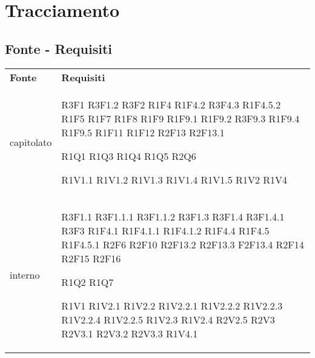 \section{Tracciamento}
	\subsection{Fonte - Requisiti}
	\begin{longtable} {
		>{\centering}p{28mm}  
		>{}p{20mm}
		}
	\rowcolor{gray!50}
		\textbf{Fonte} & \textbf{Requisiti}	\TBstrut \\
				
		capitolato & 
		R3F1
		R3F1.2
		R3F2
		R1F4
		R1F4.2
		R3F4.3
		R1F4.5.2
		R1F5
		R1F7
		R1F8
		R1F9
		R1F9.1
		R1F9.2
		R3F9.3
		R1F9.4
		R1F9.5
		R1F11
		R1F12
		R2F13
		R2F13.1
				
		R1Q1 
		R1Q3 
		R1Q4 
		R1Q5 
		R2Q6
		 
		R1V1.1 
		R1V1.2 
		R1V1.3 
		R1V1.4 
		R1V1.5 
		R1V2 
		R1V4 \TBstrut \\ [2mm]
				
		interno & 
		R3F1.1
		R3F1.1.1
		R3F1.1.2
		R3F1.3
		R3F1.4
		R3F1.4.1
		R3F3
		R1F4.1
		R1F4.1.1
		R1F4.1.2
		R1F4.4
		R1F4.5
		R1F4.5.1
		R2F6
		R2F10
		R2F13.2
		R2F13.3
		F2F13.4
		R2F14
		R2F15
		R2F16
		
		R1Q2 
		R1Q7 
		
		R1V1 
		R1V2.1 
		R1V2.2 
		R1V2.2.1 
		R1V2.2.2 
		R1V2.2.3 
		R1V2.2.4 
		R1V2.2.5 
		R1V2.3 
		R1V2.4 
		R2V2.5 
		R2V3 
		R2V3.1 
		R2V3.2 
		R2V3.3 
		R1V4.1\TBstrut \\ [2mm]
				

\end{longtable}
